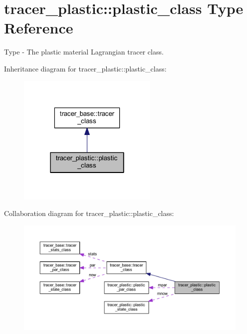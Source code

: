 \hypertarget{structtracer__plastic_1_1plastic__class}{}\section{tracer\+\_\+plastic\+:\+:plastic\+\_\+class Type Reference}
\label{structtracer__plastic_1_1plastic__class}


Type -\/ The plastic material Lagrangian tracer class.  




Inheritance diagram for tracer\+\_\+plastic\+:\+:plastic\+\_\+class\+:
\nopagebreak
\begin{figure}[H]
\begin{center}
\leavevmode
\includegraphics[width=190pt]{structtracer__plastic_1_1plastic__class__inherit__graph}
\end{center}
\end{figure}


Collaboration diagram for tracer\+\_\+plastic\+:\+:plastic\+\_\+class\+:
\nopagebreak
\begin{figure}[H]
\begin{center}
\leavevmode
\includegraphics[width=350pt]{structtracer__plastic_1_1plastic__class__coll__graph}
\end{center}
\end{figure}
